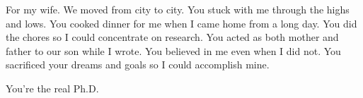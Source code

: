 \begin{center}
For my wife. We moved from city to city. You stuck with me through the highs and lows. You cooked dinner for me when I came home from a long day. You did the chores so I could concentrate on research. You acted as both mother and father to our son while I wrote. You believed in me even when I did not. You sacrificed your dreams and goals so I could accomplish mine. 
\end{center}
\vspace{\bigskipamount}
\begin{center}
You're the real Ph.D.
\end{center}



